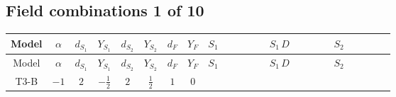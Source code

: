\documentclass[8pt]{article}
\begin{document}
\begin{landscape}
\subsection*{Field combinations 1 of 10}
\begin{longtable}{@{}cccccccc >{\raggedright\arraybackslash}p{0.21\linewidth} >{\raggedright\arraybackslash}p{0.21\linewidth} >{\raggedright\arraybackslash}p{0.21\linewidth}@{}}
\toprule
Model & $\alpha$ & $d_{S_1}$ & $Y_{S_1}$ & $d_{S_2}$ & $Y_{S_2}$ & $d_F$ & $Y_F$ & $S_1$ & $S_1\,D$ & $S_2$ \\
\midrule
\endfirsthead
\toprule
Model & $\alpha$ & $d_{S_1}$ & $Y_{S_1}$ & $d_{S_2}$ & $Y_{S_2}$ & $d_F$ & $Y_F$ & $S_1$ & $S_1\,D$ & $S_2$ \\
\midrule
\endhead
T3-B & $-1$ & $2$ & $-\frac{1}{2}$ & $2$ & $\frac{1}{2}$ & $1$ & $0$ & \scriptsize\adjustbox{max width=\linewidth}{$\begin{gathered} +C_{S_1^\dagger S_1} S_{1,j_1} S_{1,j_1}{}^{\dagger } \\ -\frac{1}{2} C_{S_1^\dagger S_1} \hbar  \overline{y_{1,i_1,r_1}} S_{1,j_1} y_{1,i_1,r_1} S_{1,j_1}{}^{\dagger } \\ -\frac{C_{S_1^\dagger S_1} \hbar  \overline{y_{1,i_1,r_1}} S_{1,j_1} y_{1,i_1,r_1} S_{1,j_1}{}^{\dagger }}{\epsilon }\end{gathered}$} & \scriptsize\adjustbox{max width=\linewidth}{$\begin{gathered} +D_{\mu _1}\left(S_{1,j_1}\right){}^{\dagger } D_{\mu _1}\left(S_{1,j_1}\right)\end{gathered}$} & \scriptsize\adjustbox{max width=\linewidth}{$\begin{gathered} +C_{S_2^\dagger S_2} S_{2,j_1} S_{2,j_1}{}^{\dagger } \\ -\frac{1}{2} C_{S_2^\dagger S_2} \hbar  \overline{y_{2,i_1,r_1}} S_{2,j_1} y_{2,i_1,r_1} S_{2,j_1}{}^{\dagger } \\ -\frac{C_{S_2^\dagger S_2} \hbar  \overline{y_{2,i_1,r_1}} S_{2,j_1} y_{2,i_1,r_1} S_{2,j_1}{}^{\dagger }}{\epsilon }\end{gathered}$} \\

\end{longtable}
\end{landscape}
\end{document}
